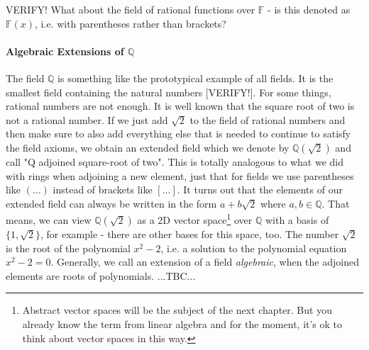 VERIFY! What about the field of rational functions over $\mathbb{F}$ - is this denoted as $\mathbb{F}(x)$, i.e. with parentheses rather than brackets?








\paragraph{Algebraic Extensions of $\mathbb{Q}$}
The field $\mathbb{Q}$ is something like the prototypical example of all fields. It is the smallest field containing the natural numbers [VERIFY!]. For some things, rational numbers are not enough. It is well known that the square root of two is not a rational number. If we just add $\sqrt{2}$ to the field of rational numbers and then make sure to also add everything else that is needed to continue to satisfy the field axioms, we obtain an extended field which we denote by $\mathbb{Q}(\sqrt{2})$ and call "Q adjoined square-root of two". This is totally analogous to what we did with rings when adjoining a new element, just that for fields we use parentheses like $(\ldots)$ instead of brackets like $[\ldots]$. It turns out that the elements of our extended field can always be written in the form $a + b \sqrt{2}$ where $a,b \in \mathbb{Q}$. That means, we can view $\mathbb{Q}(\sqrt{2})$ as a 2D vector space\footnote{Abstract vector spaces will be the subject of the next chapter. But you already know the term from linear algebra and for the moment, it's ok to think about vector spaces in this way.} over $\mathbb{Q}$ with a basis of $\{1, \sqrt{2}\}$, for example - there are other bases for this space, too. The number $\sqrt{2}$ is the root of the polynomial $x^2 - 2$, i.e. a solution to the polynomial equation $x^2 - 2 = 0$. Generally, we call an extension of a field \emph{algebraic}, when the adjoined elements are roots of polynomials. ...TBC...

